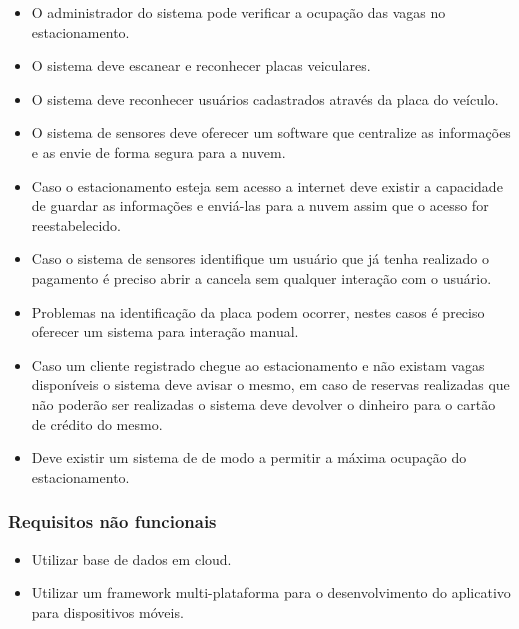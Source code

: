 \begin{itemize}
	\item O administrador do sistema pode verificar a ocupação das vagas no estacionamento.
	\item O sistema deve escanear e reconhecer placas veiculares.
	\item O sistema deve reconhecer usuários cadastrados através da placa do veículo.
	\item O sistema de sensores deve oferecer um software que centralize as informações e as envie de forma segura para a nuvem.
	\item Caso o estacionamento esteja sem acesso a internet deve existir a capacidade de guardar as informações e enviá-las para a nuvem assim que o acesso for reestabelecido.
	\item Caso o sistema de sensores identifique um usuário que já tenha realizado o pagamento é preciso abrir a cancela sem qualquer interação com o usuário.
	\item Problemas na identificação da placa podem ocorrer, nestes casos é preciso oferecer um sistema para interação manual.
	\item Caso um cliente registrado chegue ao estacionamento e não existam vagas disponíveis o sistema deve avisar o mesmo, em caso de reservas realizadas que não poderão ser realizadas o sistema deve devolver o dinheiro para o cartão de crédito do mesmo.
    \item Deve existir um sistema de  de modo a permitir a máxima ocupação do estacionamento.
\end{itemize}

\subsubsection{Requisitos não funcionais}

\begin{itemize}
	\item Utilizar base de dados em cloud.
	\item Utilizar um framework multi-plataforma para o desenvolvimento do aplicativo para dispositivos móveis.
\end{itemize}



